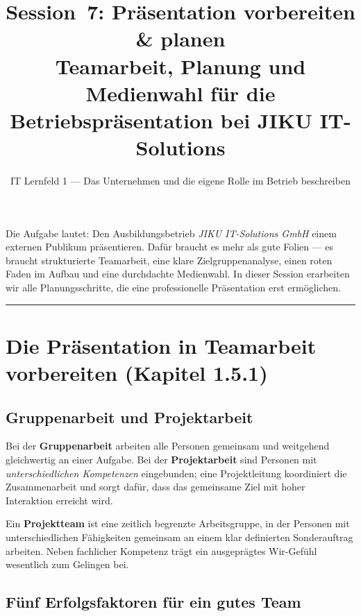 \documentclass[11pt, a4paper]{article}
\title{\vspace*{-1.5cm}\Huge\bfseries\color{bfwPrimaryDark}Session~7: Präsentation vorbereiten \& planen\\[0.4em]
  \large\color{bfwInkSoft}\textnormal{Teamarbeit, Planung und Medienwahl für die Betriebspräsentation bei JIKU IT-Solutions}}
\author{\textsf{IT Lernfeld 1 --- Das Unternehmen und die eigene Rolle im Betrieb beschreiben}}
\date{}
\begin{document}
\maketitle
\thispagestyle{empty}

\vspace{1em}
\begin{merksatz}[title={\bfseries Worum geht es in dieser Session?}]
Die Aufgabe lautet: Den Ausbildungsbetrieb \emph{JIKU IT-Solutions GmbH} einem externen Publikum
präsentieren. Dafür braucht es mehr als gute Folien --- es braucht strukturierte Teamarbeit, eine
klare Zielgruppenanalyse, einen roten Faden im Aufbau und eine durchdachte Medienwahl.
In dieser Session erarbeiten wir alle Planungsschritte, die eine professionelle Präsentation erst
ermöglichen.
\end{merksatz}

\tableofcontents
\vspace{1em}
\hrule
\vspace{1em}

\section{Die Präsentation in Teamarbeit vorbereiten (Kapitel 1.5.1)}

\subsection{Gruppenarbeit und Projektarbeit}

Bei der \textbf{Gruppenarbeit} arbeiten alle Personen gemeinsam und weitgehend gleichwertig an
einer Aufgabe. Bei der \textbf{Projektarbeit} sind Personen mit \emph{unterschiedlichen Kompetenzen}
eingebunden; eine Projektleitung koordiniert die Zusammenarbeit und sorgt dafür, dass das gemeinsame
Ziel mit hoher Interaktion erreicht wird.

\begin{merksatz}[title={\bfseries Merke: Projektteam}]
Ein \textbf{Projektteam} ist eine zeitlich begrenzte Arbeitsgruppe, in der Personen mit
unterschiedlichen Fähigkeiten gemeinsam an einem klar definierten Sonderauftrag arbeiten.
Neben fachlicher Kompetenz trägt ein ausgeprägtes Wir-Gefühl wesentlich zum Gelingen bei.
\end{merksatz}

\subsection{Fünf Erfolgsfaktoren für ein gutes Team}
\end{document}

